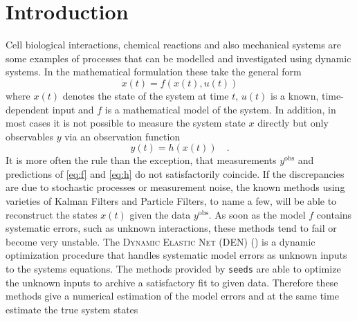 \documentclass{bioinfo}
\begin{document}
\section{Introduction}
	Cell biological interactions, chemical reactions and also mechanical systems are some 
	examples of processes that can be modelled and investigated using dynamic systems. In the 
	mathematical formulation these take the general form
	\begin{equation}
		\dot{x}(t) = f\left(x(t),u(t)\right) \label{eq:f}
	\end{equation}
	where $x(t)$ denotes the state of the system at time $t$, $u(t)$ is a known, time-
	dependent input and $f$ is a mathematical model of the system. In addition, in most 
	cases it is not possible to measure the system state $x$ directly but only 
	observables $y$ via an observation function 
	\begin{equation}
		y(t) = h\left(x(t)\right) \quad . \label{eq:h}
	\end{equation}
	It is more often the rule than the exception, that measurements $y^\text{obs}$ and 
	predictions of \eqref{eq:f} and \eqref{eq:h} do not satisfactorily coincide. If the 
	discrepancies are due to stochastic processes or measurement noise, the known methods 
	using varieties of 
	Kalman Filters and Particle Filters, to name a few, will be able to reconstruct the states 
	$x(t)$ given the data $y^\text{obs}$. As soon as the model $f$ contains systematic errors, 
	such as unknown interactions, these methods tend to fail or become very unstable. The 
	\textsc{Dynamic Elastic Net (DEN)} (\citealp{DEN}) is a dynamic optimization procedure 
	that 
	handles systematic model errors as unknown inputs to the systems equations. The methods 
	provided by \texttt{seeds} are able to optimize the unknown inputs to archive a 
	satisfactory fit to given data. Therefore these methods give a numerical estimation of 
	the model errors and at the same time estimate the true system states
\end{document}
